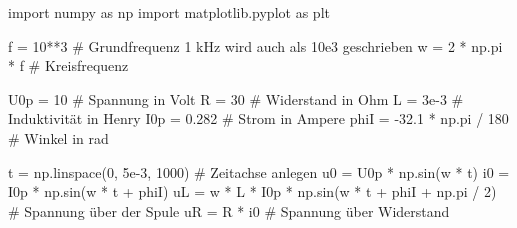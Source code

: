 \documentclass[
  ngerman,
  letterpaper,
]{scrbook}
\newenvironment{Shaded}{}{}
\newcommand{\CommentTok}[1]{\textcolor[rgb]{0.42,0.45,0.49}{#1}}
\newcommand{\DecValTok}[1]{\textcolor[rgb]{0.00,0.36,0.77}{#1}}
\newcommand{\FloatTok}[1]{\textcolor[rgb]{0.00,0.36,0.77}{#1}}
\newcommand{\ImportTok}[1]{\textcolor[rgb]{0.01,0.18,0.38}{#1}}
\newcommand{\NormalTok}[1]{\textcolor[rgb]{0.14,0.16,0.18}{#1}}
\newcommand{\OperatorTok}[1]{\textcolor[rgb]{0.14,0.16,0.18}{#1}}
\begin{document}
\begin{Shaded}
\begin{Highlighting}[]
\ImportTok{import}\NormalTok{ numpy }\ImportTok{as}\NormalTok{ np}
\ImportTok{import}\NormalTok{ matplotlib.pyplot }\ImportTok{as}\NormalTok{ plt}

\NormalTok{f }\OperatorTok{=} \DecValTok{10}\OperatorTok{**}\DecValTok{3}  \CommentTok{\# Grundfrequenz 1 kHz wird auch als 10e3 geschrieben}
\NormalTok{w }\OperatorTok{=} \DecValTok{2} \OperatorTok{*}\NormalTok{ np.pi }\OperatorTok{*}\NormalTok{ f  }\CommentTok{\# Kreisfrequenz}

\NormalTok{U0p }\OperatorTok{=} \DecValTok{10}  \CommentTok{\# Spannung in Volt}
\NormalTok{R }\OperatorTok{=} \DecValTok{30}  \CommentTok{\# Widerstand in Ohm}
\NormalTok{L }\OperatorTok{=} \FloatTok{3e{-}3}  \CommentTok{\# Induktivität in Henry}
\NormalTok{I0p }\OperatorTok{=} \FloatTok{0.282}  \CommentTok{\# Strom in  Ampere}
\NormalTok{phiI }\OperatorTok{=} \OperatorTok{{-}}\FloatTok{32.1} \OperatorTok{*}\NormalTok{ np.pi }\OperatorTok{/} \DecValTok{180}  \CommentTok{\# Winkel in rad}

\NormalTok{t }\OperatorTok{=}\NormalTok{ np.linspace(}\DecValTok{0}\NormalTok{, }\FloatTok{5e{-}3}\NormalTok{, }\DecValTok{1000}\NormalTok{)  }\CommentTok{\# Zeitachse anlegen}
\NormalTok{u0 }\OperatorTok{=}\NormalTok{ U0p }\OperatorTok{*}\NormalTok{ np.sin(w }\OperatorTok{*}\NormalTok{ t)}
\NormalTok{i0 }\OperatorTok{=}\NormalTok{ I0p }\OperatorTok{*}\NormalTok{ np.sin(w }\OperatorTok{*}\NormalTok{ t }\OperatorTok{+}\NormalTok{ phiI)}
\NormalTok{uL }\OperatorTok{=}\NormalTok{ w }\OperatorTok{*}\NormalTok{ L }\OperatorTok{*}\NormalTok{ I0p }\OperatorTok{*}\NormalTok{ np.sin(w }\OperatorTok{*}\NormalTok{ t }\OperatorTok{+}\NormalTok{ phiI }\OperatorTok{+}\NormalTok{ np.pi }\OperatorTok{/} \DecValTok{2}\NormalTok{)  }\CommentTok{\# Spannung über der Spule}
\NormalTok{uR }\OperatorTok{=}\NormalTok{ R }\OperatorTok{*}\NormalTok{ i0  }\CommentTok{\# Spannung über Widerstand}


\end{Highlighting}
\end{Shaded}
\end{document}
